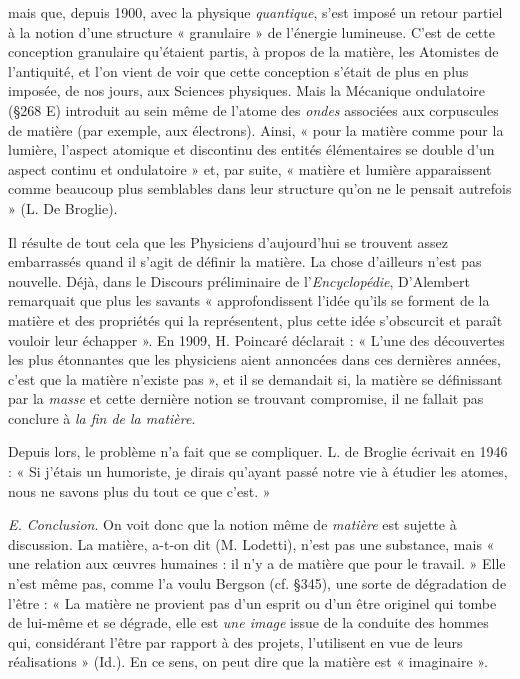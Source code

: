 {mais que, depuis 1900, avec la physique {\it quantique}, s'est imposé un
retour partiel à la notion d'une structure « granulaire » de l'énergie lumineuse.
C’est de cette conception granulaire qu'étaient partis, à propos de
la matière, les Atomistes de l'antiquité, et l'on vient de voir que cette
conception s'était de plus en plus imposée, de nos jours, aux Sciences
physiques. Mais la Mécanique ondulatoire (\S 268 E) introduit au sein même
de l’atome des {\it ondes} associées aux corpuscules de matière (par exemple, aux
électrons). Ainsi, « pour la matière comme pour la lumière, l’aspect atomique
et discontinu des entités élémentaires se double d’un aspect continu
et ondulatoire » et, par suite, « matière et lumière apparaissent comme
beaucoup plus semblables dans leur structure qu'on ne le pensait autrefois » (L. De Broglie).}
\vspace{0.31cm}

Il résulte de tout cela que les Physiciens d’aujourd’hui se trouvent
assez embarrassés quand il s’agit de définir la matière. La chose
d’ailleurs n’est pas nouvelle. Déjà, dans le Discours préliminaire de
l'{\it Encyclopédie}, D'Alembert remarquait que plus les savants « approfondissent
l’idée qu’ils se forment de la matière et des propriétés qui
la représentent, plus cette idée s’obscurcit et paraît vouloir leur
échapper ». En 1909, H. Poincaré déclarait : « L’une des découvertes
les plus étonnantes que les physiciens aient annoncées dans ces
dernières années, c’est que la matière n’existe pas », et il se demandait
si, la matière se définissant par la {\it masse} et cette dernière notion se
trouvant compromise, il ne fallait pas conclure à {\it la fin de la matière}.

Depuis lors, le problème n’a fait que se compliquer. L. de Broglie
écrivait en 1946 : « Si j'étais un humoriste, je dirais qu'ayant passé
notre vie à étudier les atomes, nous ne savons plus du tout ce que
c'est. »

{\it E. Conclusion}. On voit donc que la notion même de {\it matière} est
sujette à discussion. La matière, a-t-on dit (M. Lodetti), n’est pas
une substance, mais « une relation aux œuvres humaines : il n’y a
de matière que pour le travail. » Elle n’est même pas, comme l’a
voulu Bergson (cf. \S 345), une sorte de dégradation de l’être : « La
matière ne provient pas d’un esprit ou d’un être originel qui tombe de
lui-même et se dégrade, elle est {\it une image} issue de la conduite des
hommes qui, considérant l’être par rapport à des projets, l’utilisent
en vue de leurs réalisations » (Id.). En ce sens, on peut dire que la
matière est « imaginaire ».

